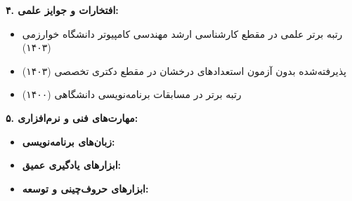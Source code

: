 {\vspace{0.4cm}
\noindent
\textbf{۴. افتخارات و جوایز علمی:}\par
\begin{itemize}[leftmargin=1.5cm, noitemsep]
  \item رتبه برتر علمی در مقطع کارشناسی ارشد مهندسی کامپیوتر دانشگاه خوارزمی (۱۴۰۳)
  \item پذیرفته‌شده بدون آزمون استعدادهای درخشان در مقطع دکتری تخصصی (۱۴۰۳)
  \item رتبه برتر در مسابقات برنامه‌نویسی دانشگاهی (۱۴۰۰)
\end{itemize}

\vspace{0.4cm}
\noindent
\textbf{۵. مهارت‌های فنی و نرم‌افزاری:}\par
\begin{itemize}[leftmargin=1.5cm, noitemsep]
  \item \textbf{زبان‌های برنامه‌نویسی:} 
  \item \textbf{ابزارهای یادگیری عمیق:} 
  \item \textbf{ابزارهای حروف‌چینی و توسعه:} 
\end{itemize}
}
